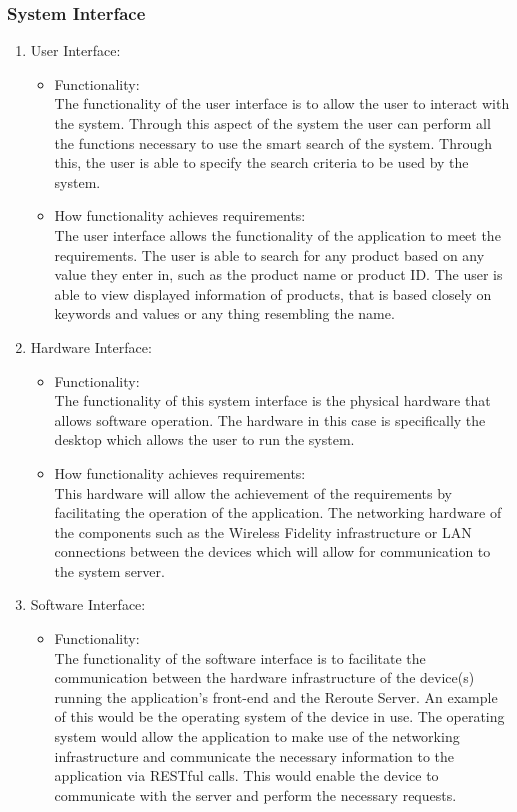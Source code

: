 \documentclass[a4paper,10pt]{article}
\begin{document}
        \subsubsection{System Interface}{
			\begin{enumerate} 
				\item User Interface:
					\begin{itemize}
				\item Functionality:\\
					The functionality of the user interface is to allow the user to interact with the system. Through this aspect of the system the user can perform all the functions necessary to use the smart search of the system. Through this, the user is able to specify the search criteria to be used by the system.\\
				\item How functionality achieves requirements:\\	
					The user interface allows the functionality of the application to meet the requirements. The user is able to search for any product based on any value they enter in, such as the product name or product ID. The user is able to view displayed information of products, that is based closely on keywords and values or any thing resembling the name. \\
					\end{itemize}
					
				\item Hardware Interface:
					\begin{itemize}
					\item Functionality:\\
					The functionality of this system interface is the physical hardware that allows software operation. The hardware in this case is specifically the desktop which allows the user to run the system.\\
				\item How functionality achieves requirements:\\
					This hardware will allow the achievement of the requirements by facilitating the operation of the application. The networking hardware of the components such as the Wireless Fidelity infrastructure or LAN connections between the devices which will allow for communication to the system server.
				\end{itemize}
				
				\item Software Interface:
					\begin{itemize}
					\item Functionality:\\
						The functionality of the software interface is to facilitate the communication between the hardware infrastructure of the device(s) running the application's front-end and the Reroute Server. An example of this would be the operating system of the device in use. The operating system would allow the application to make use of the networking infrastructure and communicate the necessary information to the application via RESTful calls. This would enable the device to communicate with the server and perform the necessary requests.\\


\end{itemize}
\end{enumerate}}
\end{document}
